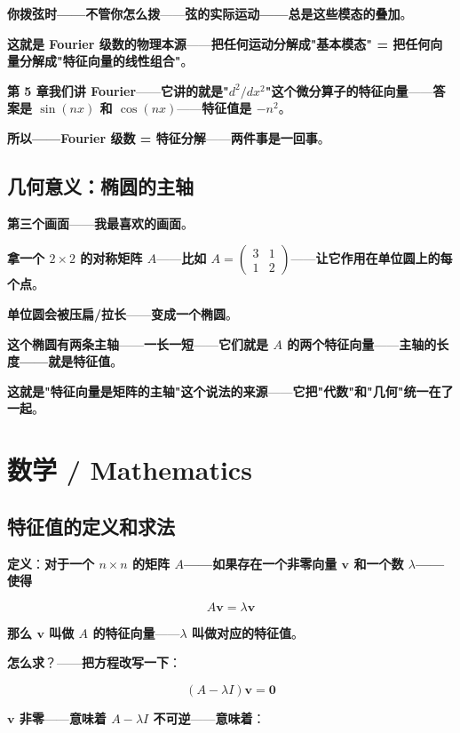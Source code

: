 \textbf{你拨弦时——不管你怎么拨}——\textbf{弦的实际运动——总是这些模态的叠加}。

\textbf{这就是 Fourier 级数的物理本源}——\textbf{把任何运动分解成"基本模态" = 把任何向量分解成"特征向量的线性组合"}。

\textbf{第 5 章我们讲 Fourier}——\textbf{它讲的就是"$d^2/dx^2$"这个微分算子的特征向量}——\textbf{答案是 $\sin(nx)$ 和 $\cos(nx)$}——\textbf{特征值是 $-n^2$}。

\textbf{所以——Fourier 级数 = 特征分解}——\textbf{两件事是一回事}。

\subsection{几何意义：椭圆的主轴}

\textbf{第三个画面}——\textbf{我最喜欢的画面}。

\textbf{拿一个 $2\times 2$ 的对称矩阵 $A$}——\textbf{比如 $A = \begin{pmatrix} 3 & 1 \\ 1 & 2 \end{pmatrix}$}——\textbf{让它作用在单位圆上的每个点}。

\textbf{单位圆会被压扁/拉长}——\textbf{变成一个椭圆}。

\textbf{这个椭圆有两条主轴}——\textbf{一长一短}——\textbf{它们就是 $A$ 的两个特征向量}——\textbf{主轴的长度——就是特征值}。

\textbf{这就是"特征向量是矩阵的主轴"这个说法的来源}——\textbf{它把"代数"和"几何"统一在了一起}。

\section{数学 / Mathematics}

\subsection{特征值的定义和求法}

\textbf{定义}：\textbf{对于一个 $n\times n$ 的矩阵 $A$——如果存在一个非零向量 $\bm{v}$ 和一个数 $\lambda$——使得}

\[
A\bm{v} = \lambda \bm{v}
\]

\textbf{那么 $\bm{v}$ 叫做 $A$ 的特征向量}——\textbf{$\lambda$ 叫做对应的特征值}。

\textbf{怎么求}？——\textbf{把方程改写一下}：

\[
(A - \lambda I)\bm{v} = \bm{0}
\]

\textbf{$\bm{v}$ 非零}——\textbf{意味着 $A - \lambda I$ 不可逆}——\textbf{意味着}：

